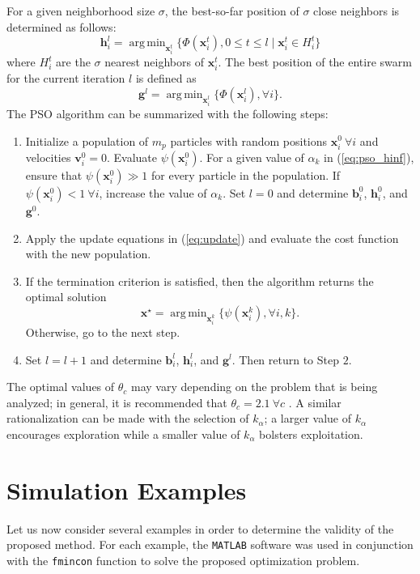 \documentclass[letterpaper, 10 pt, conference]{ieeeconf}  %
\DeclareMathOperator*{\argmin}{arg\,min}
\begin{document}
For a given neighborhood size $\sigma$, the best-so-far position of $\sigma$ close neighbors is determined as follows:
\begin{equation}
\bm{h}_i^l = \argmin_{\bm{x}_i^t} \{\Phi(\bm{x}_i^t),0\leq t \leq l\mid \bm{x}_i^t \in H_i^t \}
\end{equation}
where $H_i^t$ are the $\sigma$ nearest neighbors of $\bm{x}_i^t$. The best position of the entire swarm for the current iteration $l$ is defined as
\begin{equation}
\bm{g}^l = \argmin_{\bm{x}_i^l} \{\Phi(\bm{x}_i^l), \forall i \}.
\end{equation}
The PSO algorithm can be summarized with the following steps:

\begin{enumerate}
  \def\makelabel{Step~}
  \item{Initialize a population of $m_p$ particles with random positions $\bm{x}_i^0 \ \forall i$ and velocities $\bm{v}_i^0=0$. Evaluate $\psi(\bm{x}_i^0)$. For a given value of $\alpha_k$ in (\ref{eq:pso_hinf}), ensure that $\psi(\bm{x}_i^0) \gg 1$ for every particle in the population. If $\psi(\bm{x}_i^0) < 1 \ \forall i$, increase the value of $\alpha_k$. Set $l=0$ and determine $\bm{b}_i^0$, $\bm{h}_i^0$, and $\bm{g}^0$.}
  \item{Apply the update equations in (\ref{eq:update}) and evaluate the cost function with the new population. }
  \item{If the termination criterion is satisfied, then the algorithm returns the optimal solution 
  \begin{equation}
  \bm{x}^{\star} = \argmin_{\bm{x}_i^k} \{\psi(\bm{x}_i^k), \forall i,k \}.
  \end{equation} Otherwise, go to the next step.}
  \item{Set $l=l+1$ and determine $\bm{b}_i^l$, $\bm{h}_i^l$, and $\bm{g}^l$. Then return to Step $2$.}
\end{enumerate}
The optimal values of $\theta_c$ may vary depending on the problem that is being analyzed; in general, it is recommended that $\theta_c=2.1 \ \forall c$ \cite{Sim13}. A similar rationalization can be made with the selection of $k_\alpha$; a larger value of $k_\alpha$ encourages exploration while a smaller value of $k_\alpha$ bolsters exploitation. 
 \fi

\section{Simulation Examples} \label{sec:sim}
Let us now consider several examples in order to determine the validity of the proposed method. For each example, the \texttt{MATLAB} software was used in conjunction with the \texttt{fmincon} function to solve the proposed optimization problem. 
\end{document}
